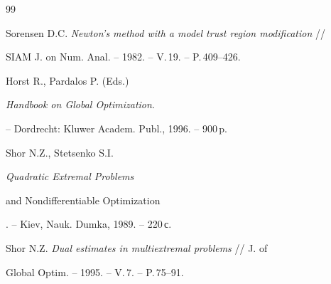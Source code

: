 \begin{thebibliography}{99}


Sorensen D.C. {\em Newton's method with a model trust region modification} //


SIAM J. on Num. Anal. -- 1982. -- V.\,19. -- P.\,409--426.







Horst R., Pardalos P. (Eds.)


{\em Handbook on Global Optimization}.


-- Dordrecht: Kluwer Academ. Publ., 1996. -- 900\,p.







Shor N.Z., Stetsenko S.I. {\em Quadratic Extremal Problems


and Nondifferentiable Optimization}. -- Kiev, Nauk. Dumka, 1989. -- 220\,с.







Shor N.Z.  {\em Dual estimates in multiextremal problems} // J. of


Global Optim. -- 1995. -- V.\,7. -- P.\,75--91.








\end{thebibliography}





\vskip 2cm












\label{end}








